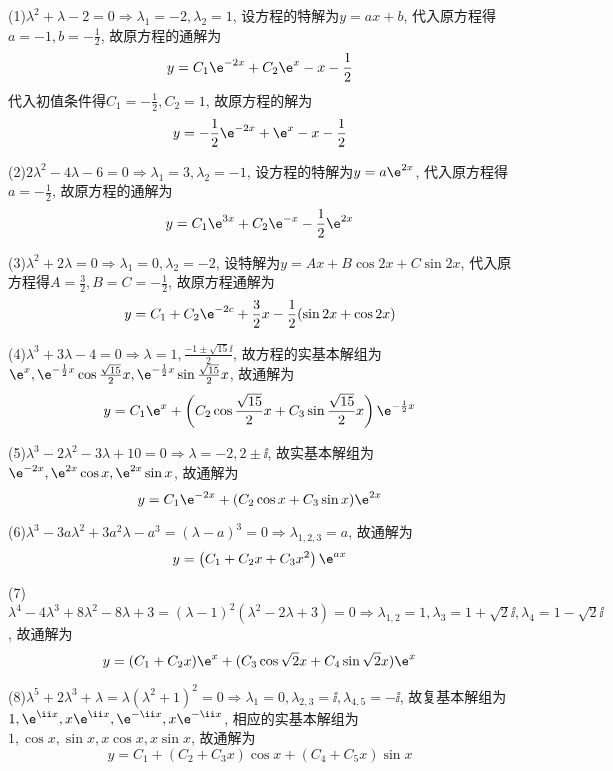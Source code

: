 \begin{solve}
(1)$\lambda^2+\lambda-2=0\Rightarrow\lambda_1=-2,\lambda_2=1$, 
设方程的特解为$y=ax+b$, 代入原方程得$a=-1,b=-\frac{1}{2}$, 故原方程的通解为
\[y=C_1\e^{-2x}+C_2\e^x-x-\frac{1}{2}\]
代入初值条件得$C_1=-\frac{1}{2},C_2=1$, 故原方程的解为
\[y=-\frac{1}{2}\e^{-2x}+\e^x-x-\frac{1}{2}\]

(2)$2\lambda^2-4\lambda-6=0\Rightarrow\lambda_1=3,\lambda_2=-1$, 
设方程的特解为$y=a\e^{2x}$, 代入原方程得$a=-\frac{1}{2}$, 故原方程的通解为
\[y=C_1\e^{3x}+C_2\e^{-x}-\frac{1}{2}\e^{2x}\]

(3)$\lambda^2+2\lambda=0\Rightarrow\lambda_1=0,\lambda_2=-2$, 
设特解为$y=Ax+B\cos 2x+C\sin2x$, 代入原方程得$A=\frac{3}{2},B=C=-\frac{1}{2}$, 故原方程通解为
\[y=C_1+C_2\e^{-2c}+\frac{3}{2}x-\frac{1}{2}(\sin2x+\cos2x)\]

(4)$\lambda^3+3\lambda-4=0\Rightarrow\lambda=1,\frac{-1\pm\sqrt{15}\ii}{2}$, 
故方程的实基本解组为$\e^x,\e^{-\frac{1}{2}x}\cos\frac{\sqrt{15}}{2}x,\e^{-\frac{1}{2}x}\sin\frac{\sqrt{15}}{2}x$, 故通解为
\[y=C_1\e^x+\left(C_2\cos\frac{\sqrt{15}}{2}x+C_3\sin\frac{\sqrt{15}}{2}x\right)\e^{-\frac{1}{2}x}\]

(5)$\lambda^3-2\lambda^2-3\lambda+10=0\Rightarrow\lambda=-2,2\pm\ii$, 
故实基本解组为$\e^{-2x},\e^{2x}\cos x,\e^{2x}\sin x$, 故通解为
\[y=C_1\e^{-2x}+(C_2\cos x+C_3\sin x)\e^{2x}\]

(6)$\lambda^3-3a\lambda^2+3a^2\lambda-a^3=(\lambda-a)^3=0\Rightarrow\lambda_{1,2,3}=a$, 故通解为
\[y=\left(C_1+C_2x+C_3x^2\right)\e^{ax}\]

(7)$\lambda^4-4\lambda^3+8\lambda^2-8\lambda+3=(\lambda-1)^2(\lambda^2-2\lambda+3)=0\Rightarrow\lambda_{1,2}=1,\lambda_3=1+\sqrt{2}\ii,\lambda_4=1-\sqrt{2}\ii$, 故通解为
\[y=(C_1+C_2x)\e^x+(C_3\cos\sqrt{2}x+C_4\sin\sqrt{2}x)\e^x\]

(8)$\lambda^5+2\lambda^3+\lambda=\lambda(\lambda^2+1)^2=0\Rightarrow\lambda_1=0,\lambda_{2,3}=\ii,\lambda_{4,5}=-\ii$, 
故复基本解组为$1,\e^{\ii x},x\e^{\ii x},\e^{-\ii x},x\e^{-\ii x}$, 相应的实基本解组为$1,\cos x,\sin x,x\cos x,x\sin x$, 故通解为
\[y=C_1+(C_2+C_3x)\cos x+(C_4+C_5x)\sin x\]


\end{solve}
